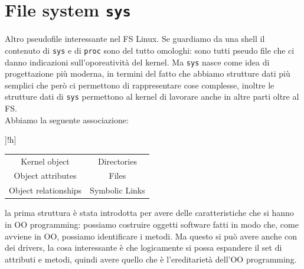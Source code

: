 \documentclass[12pt, oneside]{extbook}
\begin{document}
\section{File system \texttt{sys}}
Altro pseudofile interessante nel FS Linux. Se guardiamo da una shell il contenuto di \texttt{sys} e di \texttt{proc} sono del tutto omologhi: sono tutti pseudo file che ci danno indicazioni sull'oporeatività del kernel. Ma \texttt{sys} nasce come idea di progettazione più moderna, in termini del fatto che abbiamo strutture dati più semplici che però ci permettono di rappresentare cose complesse, inoltre le strutture dati di \texttt{sys} permettono al kernel di lavorare anche in altre parti oltre al FS.\\Abbiamo la seguente associazione:
\begin{table}]!h]
	\begin{tabular}{c | c}
		Kernel object & Directories\\
		Object attributes & Files\\
		Object relationships & Symbolic Links\\
	\end{tabular}
\end{table}
la prima struttura è stata introdotta per avere delle caratteristiche che si hanno in OO programming: possiamo costruire oggetti software fatti in modo che, come avviene in OO, possiamo identificare i metodi. Ma questo si può avere anche con dei drivers, la cosa interessante è che logicamente si possa espandere il set di attributi e metodi, quindi avere quello che è l'ereditarietà dell'OO programming.
\end{document}
